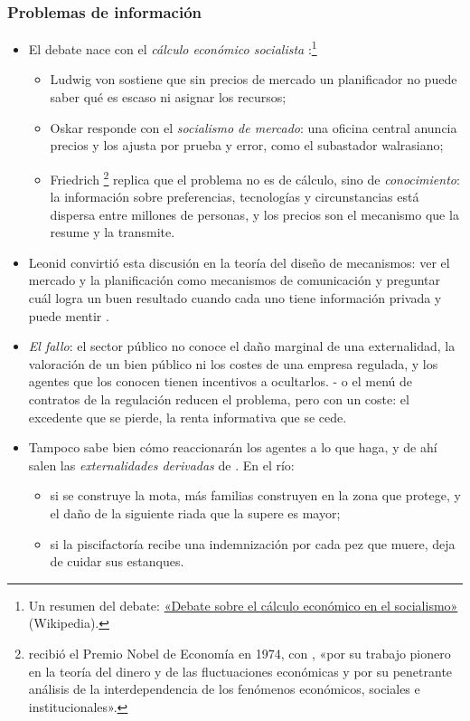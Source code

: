 \documentclass[11pt]{article}
\begin{document}
\subsubsection{Problemas de información}\label{sec:problemas-informacion}

\begin{itemize}
\item El debate nace con el \emph{cálculo económico socialista} :\footnote{Un resumen del debate: \href{https://es.wikipedia.org/wiki/Debate_sobre_el_c\%C3\%A1lculo_econ\%C3\%B3mico_en_el_socialismo}{«Debate sobre el cálculo económico en el socialismo»} (Wikipedia).}
  \begin{itemize}
  \item Ludwig von \textcite{Mises1920Wirtschaftsrechnung} sostiene que sin precios de mercado un planificador no puede saber qué es escaso ni asignar los recursos;
  \item Oskar \textcite{Lange1936Socialism} responde con el \emph{socialismo de mercado}: una oficina central anuncia precios y los ajusta por prueba y error, como el subastador walrasiano;
  \item Friedrich \textcite{Hayek1945Use}\footnote{ recibió el Premio Nobel de Economía en 1974, con , «por su trabajo pionero en la teoría del dinero y de las fluctuaciones económicas y por su penetrante análisis de la interdependencia de los fenómenos económicos, sociales e institucionales»\nocite{Nobel1974}.} replica que el problema no es de cálculo, sino de \emph{conocimiento}: la información sobre preferencias, tecnologías y circunstancias está dispersa entre millones de personas, y los precios son el mecanismo que la resume y la transmite.
  \end{itemize}
\item Leonid \textcite{Hurwicz1972Informationally} convirtió esta discusión en la teoría del diseño de mecanismos: ver el mercado y la planificación como mecanismos de comunicación y preguntar cuál logra un buen resultado cuando cada uno tiene información privada y puede mentir .
\item \emph{El fallo}: el sector público no conoce el daño marginal de una externalidad, la valoración de un bien público ni los costes de una empresa regulada, y los agentes que los conocen tienen incentivos a ocultarlos. - o el menú de contratos de la regulación  reducen el problema, pero con un coste: el excedente que se pierde, la renta informativa que se cede.
\item Tampoco sabe bien cómo reaccionarán los agentes a lo que haga, y de ahí salen las \emph{externalidades derivadas} de . En el río:
  \begin{itemize}
  \item si se construye la mota, más familias construyen en la zona que protege, y el daño de la siguiente riada que la supere es mayor;
  \item si la piscifactoría recibe una indemnización por cada pez que muere, deja de cuidar sus estanques.
  \end{itemize}
\end{itemize}
\end{document}
